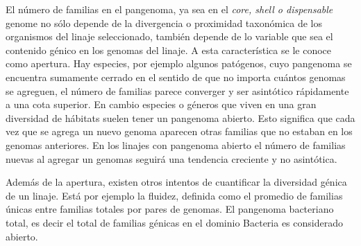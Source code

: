 \documentclass[12pt,twoside]{reedthesis}
\begin{document}
  El número de familias en el pangenoma, ya sea en el \emph{core, shell o
  dispensable} genome no sólo depende de la divergencia o proximidad
  taxonómica de los organismos del linaje seleccionado, también depende de
  lo variable que sea el contenido génico en los genomas del linaje. A
  esta característica se le conoce como apertura. Hay especies, por
  ejemplo algunos patógenos, cuyo pangenoma se encuentra sumamente cerrado
  en el sentido de que no importa cuántos genomas se agreguen, el número
  de familias parece converger y ser asintótico rápidamente a una cota
  superior. En cambio especies o géneros que viven en una gran diversidad
  de hábitats suelen tener un pangenoma abierto. Esto significa que cada
  vez que se agrega un nuevo genoma aparecen otras familias que no estaban
  en los genomas anteriores. En los linajes con pangenoma abierto el
  número de familias nuevas al agregar un genomas seguirá una tendencia
  creciente y no asintótica.
  
  Además de la apertura, existen otros intentos de cuantificar la
  diversidad génica de un linaje. Está por ejemplo la fluidez, definida
  como el promedio de familias únicas entre familias totales por pares de
  genomas. El pangenoma bacteriano total, es decir el total de familias
  génicas en el dominio Bacteria es considerado abierto.
  
\end{document}
